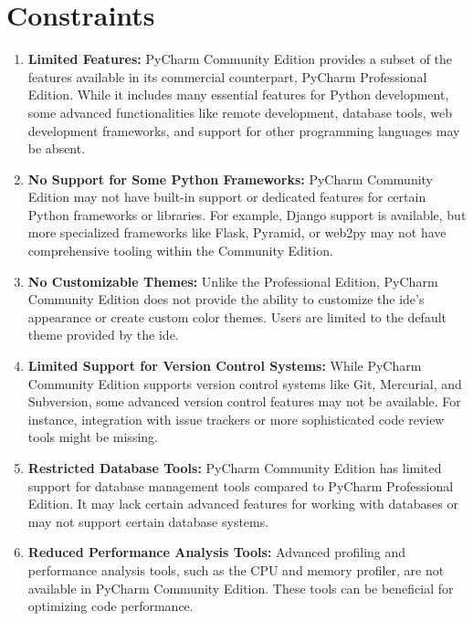 \section{Constraints}
\begin{enumerate}
	\item \textbf{Limited Features:} PyCharm Community Edition provides a subset of the features available in its commercial counterpart, PyCharm Professional Edition. While it includes many essential features for Python development, some advanced functionalities like remote development, database tools, web development frameworks, and support for other programming languages may be absent.
	
	\item \textbf{No Support for Some Python Frameworks:} PyCharm Community Edition may not have built-in support or dedicated features for certain Python frameworks or libraries. For example, Django support is available, but more specialized frameworks like Flask, Pyramid, or web2py may not have comprehensive tooling within the Community Edition.
	
	\item \textbf{No Customizable Themes:} Unlike the Professional Edition, PyCharm Community Edition does not provide the ability to customize the \ac{ide}'s appearance or create custom color themes. Users are limited to the default theme provided by the \ac{ide}.
	
	\item \textbf{Limited Support for Version Control Systems:} While PyCharm Community Edition supports version control systems like Git, Mercurial, and Subversion, some advanced version control features may not be available. For instance, integration with issue trackers or more sophisticated code review tools might be missing.
	
	\item \textbf{Restricted Database Tools:} PyCharm Community Edition has limited support for database management tools compared to PyCharm Professional Edition. It may lack certain advanced features for working with databases or may not support certain database systems.
	
	\item \textbf{Reduced Performance Analysis Tools:} Advanced profiling and performance analysis tools, such as the CPU and memory profiler, are not available in PyCharm Community Edition. These tools can be beneficial for optimizing code performance.
\end{enumerate}

